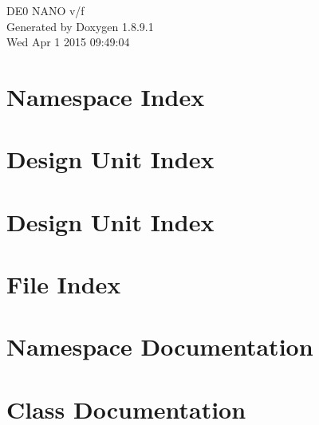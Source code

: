 \documentclass[twoside]{book}
\newcommand{\+}{\discretionary{\mbox{\scriptsize$\hookleftarrow$}}{}{}}
\newcommand{\clearemptydoublepage}{%
  \newpage{\pagestyle{empty}\cleardoublepage}%
}
\begin{document}
\hypersetup{pageanchor=false,
             bookmarks=true,
             bookmarksnumbered=true,
             pdfencoding=unicode
            }
\begin{titlepage}
\vspace*{7cm}
\begin{center}%
{\Large D\+E0 N\+A\+N\+O v/f }\\
\vspace*{1cm}
{\large Generated by Doxygen 1.8.9.1}\\
\vspace*{0.5cm}
{\small Wed Apr 1 2015 09:49:04}\\
\end{center}
\end{titlepage}
\clearemptydoublepage
\tableofcontents
\clearemptydoublepage
{}
\hypersetup{pageanchor=true}

\chapter{Namespace Index}

\chapter{Design Unit Index}

\chapter{Design Unit Index}

\chapter{File Index}

\chapter{Namespace Documentation}



\chapter{Class Documentation}




































\end{document}
